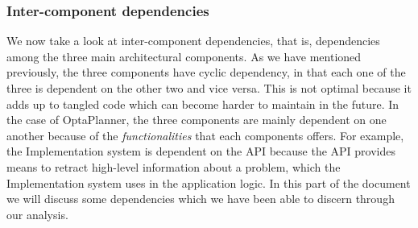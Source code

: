 \subsubsection{Inter-component dependencies}
We now take a look at inter-component dependencies, that is, dependencies among the three main architectural components. As we have mentioned previously, the three components have cyclic dependency, in that each one of the three is dependent on the other two and vice versa. This is not optimal because it adds up to tangled code which can become harder to maintain in the future. In the case of OptaPlanner, the three components are mainly dependent on one another because of the \textit{functionalities} that each components offers. For example, the Implementation system is dependent on the API because the API provides means to retract high-level information about a problem, which the Implementation system uses in the application logic. In this part of the document we will discuss some dependencies which we have been able to discern through our analysis.
